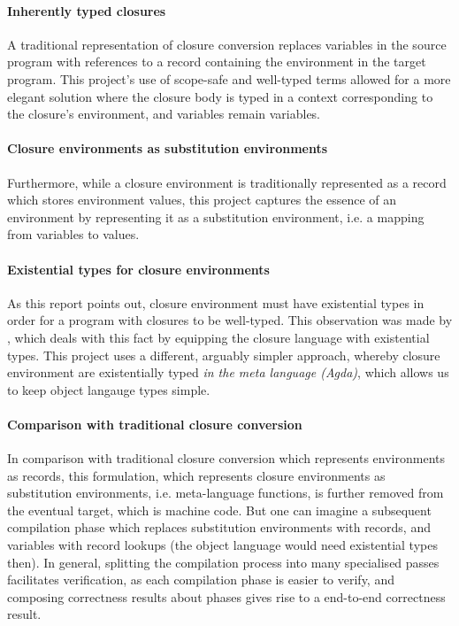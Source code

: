 \documentclass[bsc,frontabs,oneside,singlespacing,parskip,deptreport]{infthesis}
\theoremstyle{definition}
\begin{document}
\paragraph{Inherently typed closures}
A traditional representation of closure conversion replaces variables
in the source program with references to a record containing the
environment in the target program. This project's use of scope-safe
and well-typed terms allowed for a more elegant solution where the
closure body is typed in a context corresponding to the closure's
environment, and variables remain variables.

\paragraph{Closure environments as substitution environments}
Furthermore, while a closure environment is traditionally represented
as a record which stores environment values, this project captures the
essence of an environment by representing it as a substitution
environment, i.e. a mapping from variables to values.

\paragraph{Existential types for closure environments}
As this report points out, closure environment must have existential
types in order for a program with closures to be well-typed. This
observation was made by \cite{DBLP:conf/popl/MinamideMH96}, which
deals with this fact by equipping the closure language with
existential types. This project uses a different, arguably simpler
approach, whereby closure environment are existentially typed
\textit{in the meta language (Agda)}, which allows us to keep object
langauge types simple.

\paragraph{Comparison with traditional closure conversion}
In comparison with traditional closure conversion which represents
environments as records, this formulation, which represents closure
environments as substitution environments, i.e. meta-language
functions, is further removed from the eventual target, which is
machine code. But one can imagine a subsequent compilation phase which
replaces substitution environments with records, and variables with
record lookups (the object language would need existential types
then). In general, splitting the compilation process into many
specialised passes facilitates verification, as each compilation phase
is easier to verify, and composing correctness results about phases
gives rise to a end-to-end correctness result.
\end{document}

